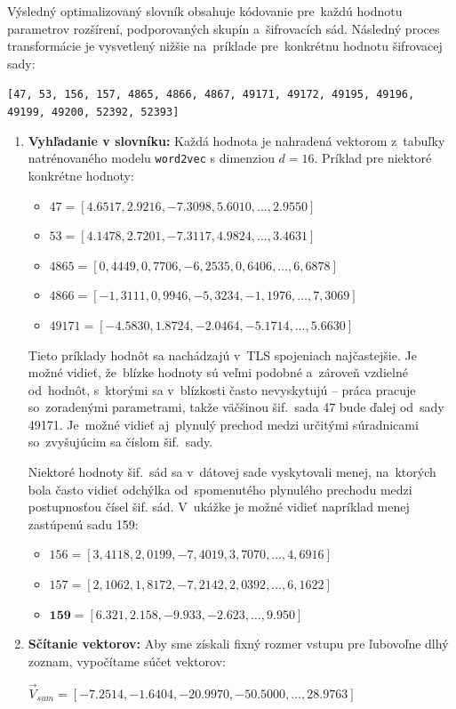 Výsledný optimalizovaný slovník obsahuje kódovanie pre~každú hodnotu parametrov rozšírení, podporovaných skupín a~šifrovacích sád. Následný proces transformácie je vysvetlený nižšie na~príklade pre~konkrétnu hodnotu šifrovacej sady:
\begin{center}
    \texttt{[47, 53, 156, 157, 4865, 4866, 4867, 49171, 49172, 49195, 49196, 49199, 49200, 52392, 52393]}
\end{center}
\begin{enumerate}
    \item \textbf{Vyhľadanie v slovníku:} Každá hodnota je nahradená vektorom z~tabuľky natrénovaného modelu \texttt{word2vec} s dimenziou $d=16$. Príklad pre niektoré konkrétne hodnoty:
    \begin{itemize}
        \item $47 = [4.6517, 2.9216, -7.3098, 5.6010, \dots, 2.9550]$
        \item $53 = [4.1478, 2.7201, -7.3117, 4.9824, \dots, 3.4631]$
        \item $4865 = [0,4449, 0,7706, -6,2535, 0,6406, \dots, 6,6878]$
        \item $4866 = [-1,3111, 0,9946, -5,3234, -1,1976, \dots, 7,3069]$
        \item $49171 = [-4.5830, 1.8724, -2.0464, -5.1714, \dots, 5.6630]$
    \end{itemize}
    Tieto príklady hodnôt sa nachádzajú v~TLS spojeniach najčastejšie. Je možné vidieť, že~blízke hodnoty sú veľmi podobné a~zároveň vzdielné od~hodnôt, s~ktorými sa v~blízkosti často nevyskytujú -- práca pracuje so~zoradenými parametrami, takže väčšinou šif.~sada 47 bude ďalej od~sady 49171. Je~možné vidieť aj~plynulý prechod medzi určitými súradnicami so~zvyšujúcim sa číslom šif.~sady. 

    Niektoré hodnoty šif.~sád sa v~dátovej sade vyskytovali menej, na~ktorých bola často vidieť odchýlka od~spomenutého plynulého prechodu medzi postupnosťou čísel šif. sád. V~ukážke je možné vidieť napríklad menej zastúpenú sadu 159:
    \begin{itemize}
        \item $156 = [3,4118, 2,0199, -7,4019, 3,7070, \dots, 4,6916]$
        \item $157 = [2,1062, 1,8172, -7,2142, 2,0392, \dots, 6,1622]$
        \item $\textbf{159} = [ 6.321, 2.158,  -9.933,  -2.623,\dots, 9.950]$
    \end{itemize}
    
    \item \textbf{Sčítanie vektorov:} Aby sme získali fixný rozmer vstupu pre ľubovoľne dlhý zoznam, vypočítame súčet vektorov:
    \begin{center}
        $\vec{V}_{sum} = [-7.2514, -1.6404, -20.9970, -50.5000, \dots, 28.9763]$
    \end{center}


\end{enumerate}
